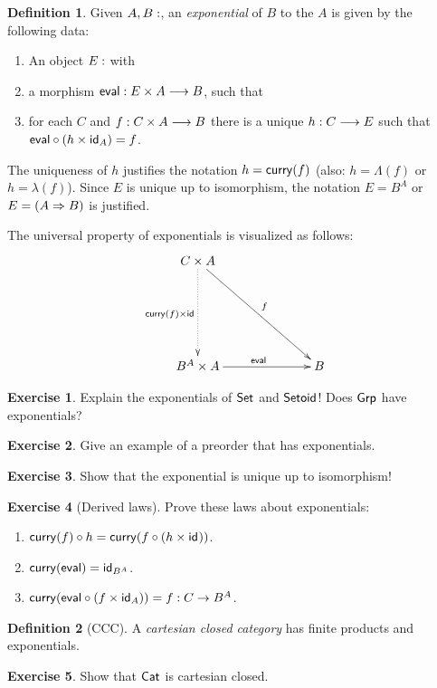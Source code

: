 \documentclass[a4paper,fleqn]{scrartcl}
\theoremstyle{definition}
\newtheorem{definition}{Definition}
\newtheorem{exercise}{Exercise}
\let\C\relax %
\newcommand{\C}{\mathcal{C}}
\begin{document}
\begin{definition}
  Given $A,B : \C$, an \emph{exponential} of $B$ to the $A$ is given
  by the following data:
  \begin{enumerate}
  \item An object $E : \C$ with
  \item a morphism $\teval : E \times A \too B$, such that
  \item for each $C$ and $f : C \times A \too B$ there is a unique $h
    : C \too E$ such that $\teval \comp (h \times \id[A]) = f$.
  \end{enumerate}
  The uniqueness of $h$ justifies the notation $h = \tcurry(f)$ (also:
  $h = \Lambda(f)$ or $h = \lambda(f)$).
  Since $E$ is unique up to isomorphism, the notation $E = B^A$ or $E
  = (A \To B)$ is justified.
\end{definition}
The universal property of exponentials is visualized as follows:
\[
\xymatrix@=16ex{
  C \times A \ar@{.>}[d]_{\tcurry(f) \times \tid}
      \ar[dr]^{f}\\
  B^A \times A \ar[r]^{\teval} & B \\
}
\]
\begin{exercise}
  Explain the exponentials of $\Set$ and $\Setoid$!
  Does $\Grp$ have exponentials?
\end{exercise}
\begin{exercise}
  Give an example of a preorder that has exponentials.
\end{exercise}
\begin{exercise}
  Show that the exponential is unique up to isomorphism!
\end{exercise}
\begin{exercise}[Derived laws]
   Prove these laws about exponentials:
   \begin{enumerate}
   \item $\tcurry(f) \comp h = \tcurry(f \comp (h \times \id))$.
   \item $\tcurry(\teval) = \id[B^A]$.
   \item $\tcurry(\teval \comp (f \times \id[A])) = f : C \to B^A$.
   \end{enumerate}
\end{exercise}

\begin{definition}[CCC]
  A \emph{cartesian closed category} has finite products and exponentials.
\end{definition}
\begin{exercise}
  Show that $\Cat$ is cartesian closed.
\end{exercise}
\end{document}
